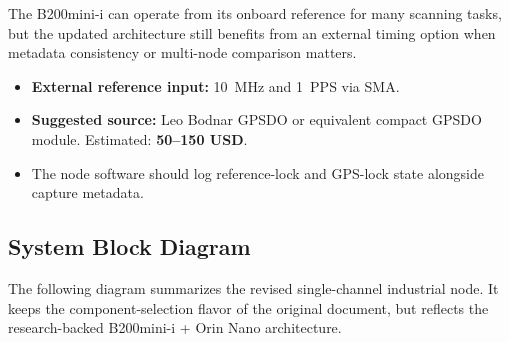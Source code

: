 \documentclass[11pt,a4paper]{article}
\newcommand{\blue}[1]{\textcolor{priceblue}{\textbf{#1}}}
\begin{document}
\begin{enumerate}[label=\roman*)]
	The B200mini-i can operate from its onboard reference for many scanning tasks,
	but the updated architecture still benefits from an external timing option when
	metadata consistency or multi-node comparison matters.

	\begin{itemize}
		\item \textbf{External reference input:} 10~MHz and 1~PPS via SMA.
		\item \textbf{Suggested source:} Leo Bodnar GPSDO or equivalent compact GPSDO
		module. Estimated: \blue{50--150 USD}.
		\item The node software should log reference-lock and GPS-lock state alongside
		capture metadata.
	\end{itemize}

\end{enumerate}

\subsection*{System Block Diagram}

The following diagram summarizes the revised single-channel industrial node. It
keeps the component-selection flavor of the original document, but reflects the
research-backed B200mini-i + Orin Nano architecture.
\end{document}
